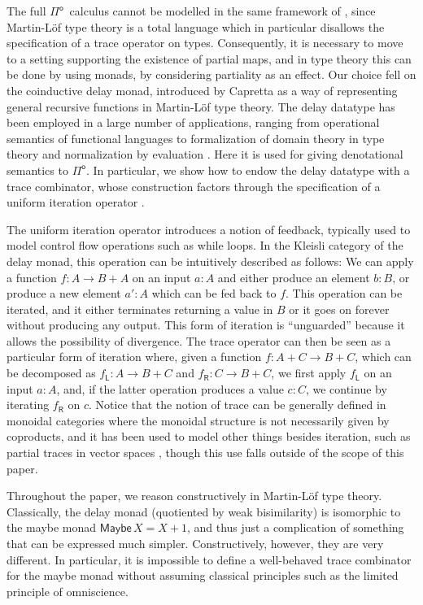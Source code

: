 \documentclass[runningheads,a4paper]{llncs}
\newcommand{\Pio}{\ensuremath{\mathsf{\Pi}^{\mathsf{o}}}}
\newcommand{\mapL}[1]{#1_{\mathsf{L}}}
\newcommand{\mapR}[1]{#1_{\mathsf{R}}}
\newcommand{\Maybe}{\mathsf{Maybe}}
\begin{document}
The full \Pio\ calculus cannot be modelled in the same framework of
\cite{CaretteS16}, since Martin-L\"of type theory is a total language
which in particular disallows the specification of a trace
operator on types. Consequently, it is necessary to move to a setting
supporting the existence of partial maps, and in type theory this can
be done by using monads, by considering partiality as an effect. Our
choice fell on the coinductive delay monad, introduced by Capretta
\cite{Capretta05} as a way of representing general recursive functions
in Martin-L\"of type theory. The delay datatype has been employed in a
large number of applications, ranging from operational semantics of
functional languages \cite{Danielsson12} to formalization of domain
theory in type theory \cite{BentonKV09} and normalization by
evaluation \cite{AbelC14}. Here it is used for giving denotational
semantics to \Pio. In particular, we show how to endow the delay
datatype with a trace combinator, whose construction factors
through the specification of a uniform iteration operator
\cite{GoncharovSRJ18,GoncharovMR16}. 

The uniform iteration operator introduces a notion of feedback,
typically used to model control flow operations such as while
loops. In the Kleisli category of the delay monad, this operation can
be intuitively described as follows: We can apply a function
$f : A \to B + A$ on an input $a : A$ and either produce an element
$b : B$, or produce a new element $a' : A$ which can be fed back to
$f$. This operation can be iterated, and it either terminates
returning a value in $B$ or it goes on forever without producing any
output. This form of iteration is ``unguarded'' because it allows the
possibility of divergence. The trace operator can then be seen as a
particular form of iteration where, given a function
$f : A + C \to B + C$, which can be decomposed as
$\mapL f : A \to B + C$ and $\mapR f : C \to B + C$, we first apply
$\mapL f$ on an input $a : A$, and, if the latter operation produces a
value $c : C$, we continue by iterating $\mapR f$ on $c$. Notice that
the notion of trace can be generally defined in monoidal categories
where the monoidal structure is not necessarily given by coproducts,
and it has been used to model other things besides iteration, such as
partial traces in vector spaces \cite{JoyalSV96}, though this use
falls outside of the scope of this paper.

Throughout the paper, we reason constructively in Martin-L\"of type
theory. Classically, the delay monad (quotiented by
weak bisimilarity)
is isomorphic to the maybe monad
$\Maybe\,X = X + 1$,
and thus just a complication of something that can be expressed much
simpler. Constructively, however, they are very different. In particular,
it is impossible to define a well-behaved trace combinator for the
maybe monad without assuming classical principles such as the limited
principle of omniscience.
\end{document}
